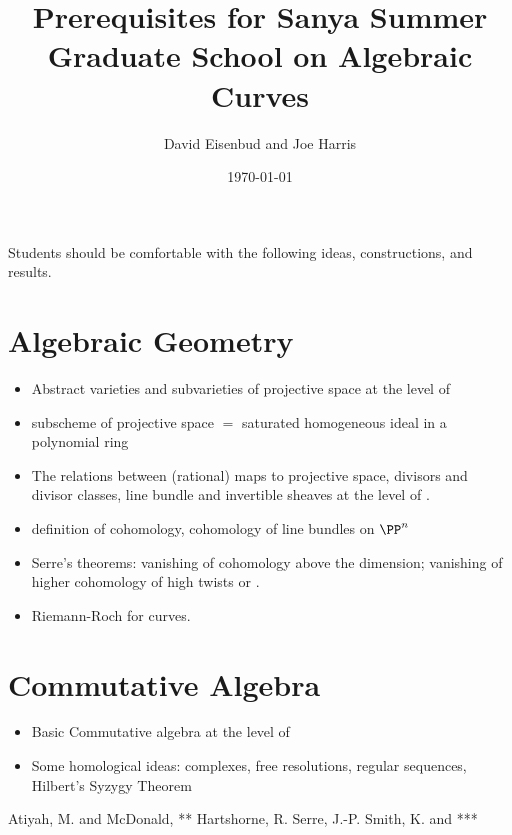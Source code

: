 \documentclass[12pt, leqno]{book}
\title{Prerequisites for Sanya Summer Graduate School on Algebraic Curves}
\author{ David Eisenbud and Joe Harris}
\date{\today}
\makeatletter
\def@{\mskip1.5mu} %
\makeatother
\begin{document}
\maketitle

\setcounter{page}{5}

Students should be comfortable with the following ideas, constructions, and results.

\section*{Algebraic Geometry}

\begin{itemize}
\item Abstract varieties and subvarieties of projective space at the level of \cite[Chapterd 1--3 ]{S}
\item subscheme of projective space $=$ saturated homogeneous ideal in a polynomial ring 
\item The relations between (rational) maps to projective space, divisors and divisor classes, line bundle and invertible sheaves at the level of \cite[Chapter 8 and Appendix]{S}.
\item definition of cohomology, cohomology of line bundles on $\PP^{n}$ \cite{FAC}
\item Serre's theorems: vanishing of cohomology above the dimension; vanishing of higher cohomology of high twists \cite{FAC} or \cite[Ch 3]{H}.
\item Riemann-Roch for curves. \cite[Section IV.1]{H} 
\end{itemize}

\section*{Commutative Algebra}
\begin{itemize}
\item Basic Commutative algebra at the level of \cite{A}
\item Some homological ideas: complexes, free resolutions, regular sequences, Hilbert's Syzygy Theorem 
\end{itemize}

\begin{thebibliography}{99}

 Atiyah, M. and McDonald, ** 
 Hartshorne, R.
 Serre, J.-P.
 Smith, K. and ***
\end{thebibliography}
\end{document}
